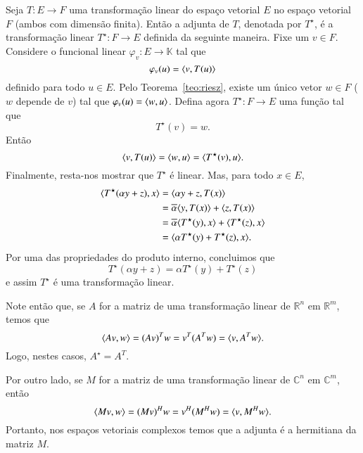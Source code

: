 \begin{defi}
  Seja $T : E\rightarrow F$ uma transformação linear do espaço vetorial $E$ no espaço vetorial $F$ (ambos com dimensão finita). Então a adjunta de $T$, denotada por $T^{\star}$, é a transformação linear $T^{\star}:F\rightarrow E$ definida da seguinte maneira. Fixe um $v\in F$. Considere o funcional linear $\varphi_v : E\to {\mathbb{K}}$ tal que
  \begin{equation*}
    \varphi_v(u) = \langle v, T(u) \rangle
  \end{equation*}
  definido para todo $u\in E$. Pelo Teorema~\ref{teo:riesz}, existe um único vetor $w\in F$ ($w$ depende de $v$) tal que $\varphi_v (u) = \langle w, u \rangle$. Defina agora $T^{\star}:F\to E$ uma função tal que
  \begin{equation*}
    T^{\star}(v) = w.
  \end{equation*}
  Então
  \begin{equation*}
    \langle v, T(u) \rangle = \langle w, u \rangle = \langle T^{\star}(v), u \rangle.
  \end{equation*}
  Finalmente, resta-nos mostrar que $T^{\star}$ é linear. Mas, para todo $x\in E$,
  \begin{align*}
    \langle T^{\star}(\alpha y + z), x \rangle &= \langle \alpha y + z, T(x) \rangle\\
    &= \overline{\alpha}\langle y, T(x) \rangle + \langle z, T(x) \rangle\\
    &= \overline{\alpha}\langle T^\star(y), x \rangle + \langle T^{\star}(z), x \rangle\\
    &= \langle \alpha T^{\star}(y)+T^{\star}(z), x \rangle.
  \end{align*}
  Por uma das propriedades do produto interno, concluimos que 
  \begin{equation*}
    T^{\star}(\alpha y + z) = \alpha T^{\star}(y)+T^{\star}(z)
  \end{equation*}
  e assim $T^{\star}$ é uma transformação linear.
\end{defi}

Note então que, se $A$ for a matriz de uma transformação linear de ${\mathbb{R}}^n$ em ${\mathbb{R}}^m$, temos que
\begin{equation*}
  \langle Av, w \rangle = (Av)^Tw = v^T(A^Tw) = \langle v, A^Tw \rangle.
\end{equation*}
Logo, nestes casos, $A^{\star}=A^T$.

Por outro lado, se $M$ for a matriz de uma transformação linear de ${\mathbb{C}}^n$ em ${\mathbb{C}}^m$, então
\begin{equation*}
  \langle Mv, w \rangle = (Mv)^Hw = v^H(M^Hw) = \langle v, M^Hw \rangle.
\end{equation*}
Portanto, nos espaços vetoriais complexos temos que a adjunta é a hermitiana da matriz $M$.

